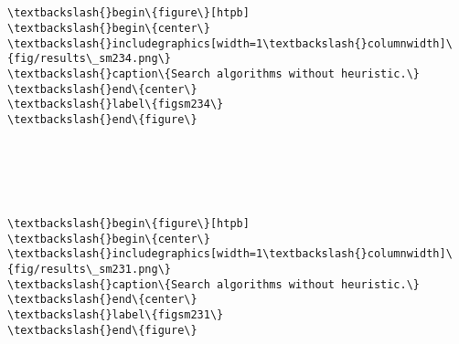\documentclass[11pt]{article}
\begin{document}
    \begin{Verbatim}[commandchars=\\\{\}]


\textbackslash{}begin\{figure\}[htpb]
\textbackslash{}begin\{center\}
\textbackslash{}includegraphics[width=1\textbackslash{}columnwidth]\{fig/results\_sm234.png\}
\textbackslash{}caption\{Search algorithms without heuristic.\}
\textbackslash{}end\{center\}
\textbackslash{}label\{figsm234\}
\textbackslash{}end\{figure\}
    

    \end{Verbatim}

    \begin{center}
    \end{center}
    { \hspace*{\fill} \\}
    
    \begin{Verbatim}[commandchars=\\\{\}]


\textbackslash{}begin\{figure\}[htpb]
\textbackslash{}begin\{center\}
\textbackslash{}includegraphics[width=1\textbackslash{}columnwidth]\{fig/results\_sm231.png\}
\textbackslash{}caption\{Search algorithms without heuristic.\}
\textbackslash{}end\{center\}
\textbackslash{}label\{figsm231\}
\textbackslash{}end\{figure\}
    

    \end{Verbatim}
\end{document}
